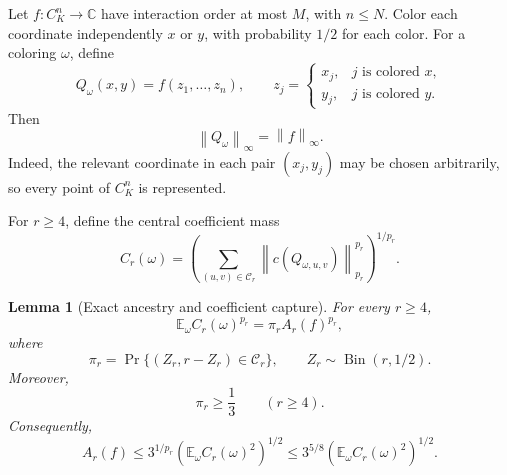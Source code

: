 \documentclass[11pt]{article}
\newtheorem{lemma}[theorem]{Lemma}
\theoremstyle{definition}
\theoremstyle{remark}
\newcommand{\E}{\mathbb{E}}
\newcommand{\C}{\mathbb{C}}
\newcommand{\norm}[1]{\left\lVert #1\right\rVert}
\DeclareMathOperator{\Bin}{Bin}
\begin{document}
Let $f:C_K^n\to\C$ have interaction order at most $M$, with $n\le N$.
Color each coordinate independently $x$ or $y$, with probability $1/2$ for
each color.  For a coloring $\omega$, define
\begin{equation}
\label{eq:Qomega}
 Q_\omega(x,y)=f(z_1,\ldots,z_n),
 \qquad
 z_j=
 \begin{cases}
 x_j,&j\text{ is colored }x,\\
 y_j,&j\text{ is colored }y.
 \end{cases}
\end{equation}
Then
\begin{equation}
\label{eq:norm-equality}
 \norm{Q_\omega}_\infty=\norm f_\infty.
\end{equation}
Indeed, the relevant coordinate in each pair $(x_j,y_j)$ may be chosen
arbitrarily, so every point of $C_K^n$ is represented.

For $r\ge4$, define the central coefficient mass
\begin{equation}
\label{eq:Cr-omega}
 C_r(\omega)=
 \left(
  \sum_{(u,v)\in\mathcal C_r}
  \norm{c(Q_{\omega,u,v})}_{p_r}^{p_r}
 \right)^{1/p_r}.
\end{equation}

\begin{lemma}[Exact ancestry and coefficient capture]
\label{lem:capture}
For every $r\ge4$,
\begin{equation}
\label{eq:capture-exact}
 \E_\omega C_r(\omega)^{p_r}
 =\pi_r A_r(f)^{p_r},
\end{equation}
where
\begin{equation}
\label{eq:pi-r}
 \pi_r=
 \Pr\{(Z_r,r-Z_r)\in\mathcal C_r\},
 \qquad Z_r\sim\Bin(r,1/2).
\end{equation}
Moreover,
\begin{equation}
\label{eq:pi-lower}
 \pi_r\ge\frac13\qquad(r\ge4).
\end{equation}
Consequently,
\begin{equation}
\label{eq:Ar-capture}
 A_r(f)
 \le3^{1/p_r}
 \left(\E_\omega C_r(\omega)^2\right)^{1/2}
 \le3^{5/8}
 \left(\E_\omega C_r(\omega)^2\right)^{1/2}.
\end{equation}
\end{lemma}
\end{document}
